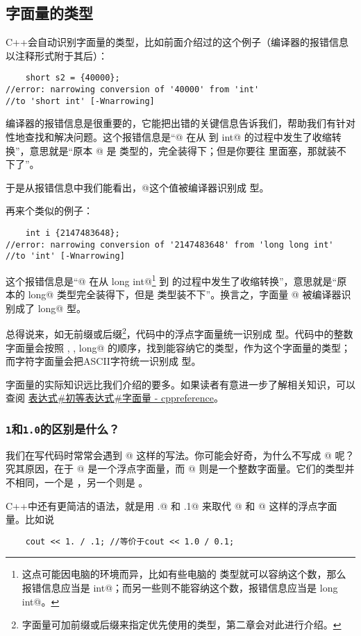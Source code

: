 \subsection*{字面量的类型}
C++会自动识别字面量的类型，比如前面介绍过的这个例子（编译器的报错信息以注释形式附于其后）：
\begin{lstlisting}
    short s2 = {40000};
//error: narrowing conversion of '40000' from 'int'
//to 'short int' [-Wnarrowing]
\end{lstlisting}
编译器的报错信息是很重要的，它能把出错的关键信息告诉我们，帮助我们有针对性地查找和解决问题。这个报错信息是``@ 在从 \lstinline@int@ 到 \lstinline@short int@ 的过程中发生了收缩转换''，意思就是``原本 @ 是 \lstinline@int@ 类型的，完全装得下；但是你要往 \lstinline@short@ 里面塞，那就装不下了''。\par
于是从报错信息中我们能看出，@这个值被编译器识别成 \lstinline@int@ 型。\par
再来个类似的例子：
\begin{lstlisting}
    int i {2147483648};
//error: narrowing conversion of '2147483648' from 'long long int'
//to 'int' [-Wnarrowing]
\end{lstlisting}
这个报错信息是``@ 在从 \lstinline@long long int@\footnote{这点可能因电脑的环境而异，比如有些电脑的 \lstinline@long@ 类型就可以容纳这个数，那么报错信息应当是 \lstinline@long int@；而另一些则不能容纳这个数，报错信息应当是 \lstinline@long long int@。} 到 \lstinline@int@ 的过程中发生了收缩转换''，意思就是``原本的 \lstinline@long long@ 类型完全装得下，但是 \lstinline@int@ 类型装不下''。换言之，字面量 @ 被编译器识别成了 \lstinline@long long@ 型。\par
总得说来，如无前缀或后缀\footnote{字面量可加前缀或后缀来指定优先使用的类型，第二章会对此进行介绍。}，代码中的浮点字面量统一识别成 \lstinline@double@ 型。代码中的整数字面量会按照 \lstinline@int@, \lstinline@long@, \lstinline@long long@ 的顺序，找到能容纳它的类型，作为这个字面量的类型；而字符字面量会把ASCII字符统一识别成 \lstinline@char@ 型。\par
字面量的实际知识远比我们介绍的要多。如果读者有意进一步了解相关知识，可以查阅 \href{https://zh.cppreference.com/w/cpp/language/expressions#.E5.AD.97.E9.9D.A2.E9.87.8F}{表达式\#初等表达式\#字面量 - cppreference}。\par
\subsubsection*{\texttt{1}和\texttt{1.0}的区别是什么？}
我们在写代码时常常会遇到 @ 这样的写法。你可能会好奇，为什么不写成 @ 呢？究其原因，在于 @ 是一个浮点字面量，而 @ 则是一个整数字面量。它们的类型并不相同，一个是 \lstinline@double@，另一个则是 \lstinline@int@。\par
C++中还有更简洁的语法，就是用 .@ 和 \lstinline@.1@ 来取代 @ 和 @ 这样的浮点字面量。比如说
\begin{lstlisting}
    cout << 1. / .1; //等价于cout << 1.0 / 0.1;
\end{lstlisting}\par
